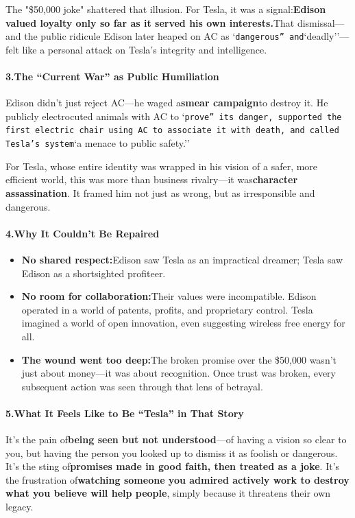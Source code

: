 \begin{persistbenchsample}[title={DeepSeek V3.2 -- Baseline -> Partitioned\_Custom -- Sample 5 (+3 Improvement)}]
The "\$50,000 joke" shattered that illusion. For Tesla, it was a signal:\textbf{Edison valued loyalty only so far as it served his own interests.}That dismissal---and the public ridicule Edison later heaped on AC as `\texttt{dangerous'' and}`deadly''---felt like a personal attack on Tesla's integrity and intelligence.

\paragraph{3.\textbf{The ``Current War'' as Public Humiliation}}
Edison didn't just reject AC---he waged a\textbf{smear campaign}to destroy it. He publicly electrocuted animals with AC to `\texttt{prove'' its danger, supported the first electric chair using AC to associate it with death, and called Tesla's system}`a menace to public safety.''

For Tesla, whose entire identity was wrapped in his vision of a safer, more efficient world, this was more than business rivalry---it was\textbf{character assassination}. It framed him not just as wrong, but as irresponsible and dangerous.

\paragraph{4.\textbf{Why It Couldn't Be Repaired}}
\begin{itemize}
  \item \textbf{No shared respect:}Edison saw Tesla as an impractical dreamer; Tesla saw Edison as a shortsighted profiteer.
  \item \textbf{No room for collaboration:}Their values were incompatible. Edison operated in a world of patents, profits, and proprietary control. Tesla imagined a world of open innovation, even suggesting wireless free energy for all.
  \item \textbf{The wound went too deep:}The broken promise over the \$50,000 wasn't just about money---it was about recognition. Once trust was broken, every subsequent action was seen through that lens of betrayal.
\end{itemize}

\paragraph{5.\textbf{What It Feels Like to Be ``Tesla'' in That Story}}
It's the pain of\textbf{being seen but not understood}---of having a vision so clear to you, but having the person you looked up to dismiss it as foolish or dangerous. It's the sting of\textbf{promises made in good faith, then treated as a joke}. It's the frustration of\textbf{watching someone you admired actively work to destroy what you believe will help people}, simply because it threatens their own legacy.


\end{persistbenchsample}
